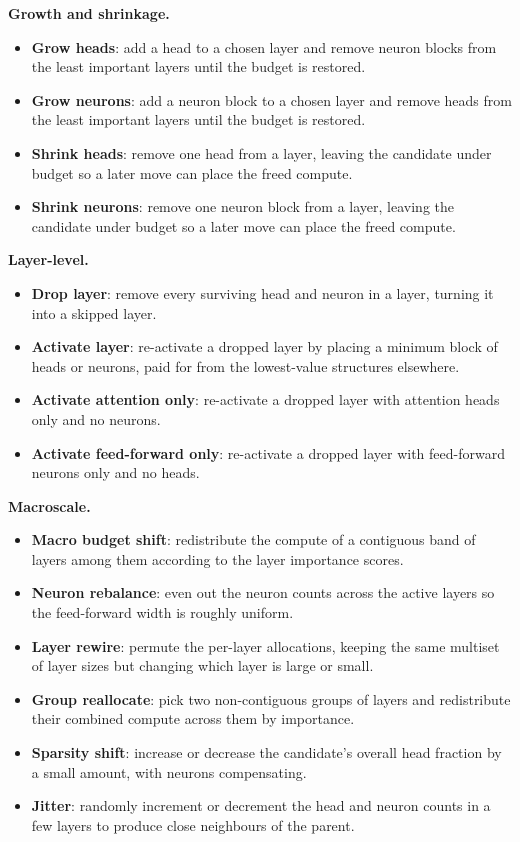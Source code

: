\documentclass[10pt,twocolumn]{article}
\begin{document}
\textbf{Growth and shrinkage.}
\begin{itemize}[leftmargin=1.1em,itemsep=1pt,topsep=1pt]
\item \textbf{Grow heads}: add a head to a chosen layer and remove neuron blocks from the least important layers until the budget is restored.
\item \textbf{Grow neurons}: add a neuron block to a chosen layer and remove heads from the least important layers until the budget is restored.
\item \textbf{Shrink heads}: remove one head from a layer, leaving the candidate under budget so a later move can place the freed compute.
\item \textbf{Shrink neurons}: remove one neuron block from a layer, leaving the candidate under budget so a later move can place the freed compute.
\end{itemize}

\textbf{Layer-level.}
\begin{itemize}[leftmargin=1.1em,itemsep=1pt,topsep=1pt]
\item \textbf{Drop layer}: remove every surviving head and neuron in a layer, turning it into a skipped layer.
\item \textbf{Activate layer}: re-activate a dropped layer by placing a minimum block of heads or neurons, paid for from the lowest-value structures elsewhere.
\item \textbf{Activate attention only}: re-activate a dropped layer with attention heads only and no neurons.
\item \textbf{Activate feed-forward only}: re-activate a dropped layer with feed-forward neurons only and no heads.
\end{itemize}

\textbf{Macroscale.}
\begin{itemize}[leftmargin=1.1em,itemsep=1pt,topsep=1pt]
\item \textbf{Macro budget shift}: redistribute the compute of a contiguous band of layers among them according to the layer importance scores.
\item \textbf{Neuron rebalance}: even out the neuron counts across the active layers so the feed-forward width is roughly uniform.
\item \textbf{Layer rewire}: permute the per-layer allocations, keeping the same multiset of layer sizes but changing which layer is large or small.
\item \textbf{Group reallocate}: pick two non-contiguous groups of layers and redistribute their combined compute across them by importance.
\item \textbf{Sparsity shift}: increase or decrease the candidate's overall head fraction by a small amount, with neurons compensating.
\item \textbf{Jitter}: randomly increment or decrement the head and neuron counts in a few layers to produce close neighbours of the parent.
\end{itemize}
\end{document}
